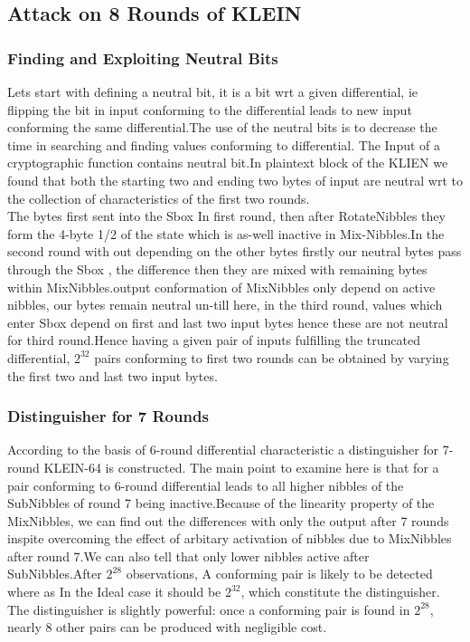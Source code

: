 \documentclass[preprint]{transcrypto}
\begin{document}
\subsection{Attack on 8 Rounds of KLEIN}

\subsubsection{Finding and Exploiting Neutral Bits}
Lets start with defining a neutral bit, it is a bit wrt a given differential, ie flipping the bit in input conforming to the differential leads to new input conforming the same differential.The use of the  neutral bits is to decrease the time in searching and finding values conforming to differential.
The Input of a cryptographic function contains neutral bit.In plaintext block of the KLIEN we found that both the starting two and ending two bytes of input are neutral wrt to the collection of characteristics of the first two rounds.\\

The bytes first sent into the Sbox In first round, then after RotateNibbles they form the 4-byte 1/2 of the state which is as-well inactive in Mix-Nibbles.In the second round with out depending on the other bytes firstly our neutral bytes pass through the Sbox , the difference then they are mixed with remaining bytes within MixNibbles.output conformation of MixNibbles only depend on active nibbles, our bytes remain neutral un-till here, in the third round, values which enter Sbox depend on first and last two input bytes hence these are not neutral for third round.Hence having a given pair of inputs fulfilling the truncated differential, $2^{32}$ pairs conforming to first two rounds can be obtained by varying the first two and last two input bytes.\\

\subsubsection{Distinguisher for 7 Rounds}
According to the basis of 6-round differential characteristic a distinguisher for 7-round KLEIN-64 is constructed. The main point to examine here is that for a pair conforming to 6-round differential leads to all higher nibbles of the SubNibbles of round 7 being inactive.Because of the linearity property of the MixNibbles, we can find out the differences with only the output after 7 rounds inspite overcoming the effect of arbitary activation of nibbles due to MixNibbles after round 7.We can also tell that only lower nibbles active after SubNibbles.After $2^{28}$ observations, A conforming pair is likely to be detected where as In the Ideal case it should be $2^{32}$, which constitute the distinguisher. The distinguisher is slightly powerful: once a conforming pair is found in $2^{28}$, nearly 8 other pairs can be produced with negligible cost.\\
\end{document}
